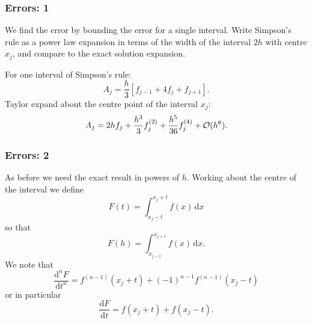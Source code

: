 \documentclass{beamer}
\begin{document}
\begin{frame}
  \frametitle{Errors: 1}

  We find the error by bounding the error for a single interval.
  Write Simpson's rule as a power law expansion in terms of the width
  of the interval $2 h$ with centre $x_j$, and compare to the exact
  solution expansion. \pause

  \vspace{1ex}

  For one interval of Simpson's rule:
  \begin{equation*}
    A_j = \frac{h}{3} \left[ f_{j-1} + 4 f_j + f_{j+1} \right].
  \end{equation*}
  Taylor expand about the centre point of the interval $x_j$:
  \begin{equation*}
    A_j = 2 h f_j + \frac{h^3}{3} f^{(2)}_j + \frac{h^5}{36} f^{(4)}_j
    + {\cal O}(h^6).
  \end{equation*}

\end{frame}

\begin{frame}
  \frametitle{Errors: 2}

  As before we need the exact result in powers of $h$. Working about
  the centre of the interval we define
  \begin{equation*}
    F(t) = \int_{x_j - t}^{x_j + t} f(x) \, \text{d}x
  \end{equation*}
  so that
  \begin{equation*}
    F(h) = \int_{x_{j-1}}^{x_{j+1}} f(x) \, \text{d}x.
  \end{equation*}
  We note that
  \begin{equation*}
    \frac{\text{d}^n F}{\text{d}t^n} = f^{(n-1)}(x_j + t) + (-1)^{n-1}
    f^{(n-1)}(x_j - t)
  \end{equation*}
  or in particular
  \begin{equation*}
    \frac{\text{d} F}{\text{d}t} = f(x_j + t) + f(x_j - t).
  \end{equation*}
\end{frame}
\end{document}
